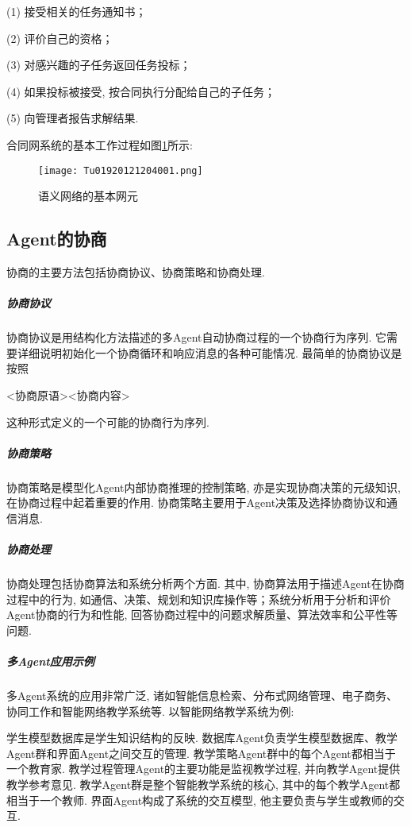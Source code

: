     (1) 接受相关的任务通知书；

    (2) 评价自己的资格；

    (3) 对感兴趣的子任务返回任务投标；

    (4) 如果投标被接受, 按合同执行分配给自己的子任务；

    (5)  向管理者报告求解结果.

合同网系统的基本工作过程如图\ref{Tu01920121204001}所示:
\begin{figure}[H]
\centering
\texttt{[image: Tu01920121204001.png]}
\caption{语义网络的基本网元}
\label{Tu01920121204001}
\end{figure}
\subsection{Agent的协商}
协商的主要方法包括协商协议、协商策略和协商处理.
\subparagraph{协商协议}
    协商协议是用结构化方法描述的多Agent自动协商过程的一个协商行为序列. 它需要详细说明初始化一个协商循环和响应消息的各种可能情况. 最简单的协商协议是按照
\begin{center}
  <协商原语><协商内容>
\end{center}
这种形式定义的一个可能的协商行为序列.
\subparagraph{协商策略}
协商策略是模型化Agent内部协商推理的控制策略, 亦是实现协商决策的元级知识, 在协商过程中起着重要的作用. 协商策略主要用于Agent决策及选择协商协议和通信消息.
\subparagraph{协商处理}
协商处理包括协商算法和系统分析两个方面. 其中, 协商算法用于描述Agent在协商过程中的行为, 如通信、决策、规划和知识库操作等；系统分析用于分析和评价Agent协商的行为和性能, 回答协商过程中的问题求解质量、算法效率和公平性等问题.
\subparagraph{多Agent应用示例}
多Agent系统的应用非常广泛, 诸如智能信息检索、分布式网络管理、电子商务、协同工作和智能网络教学系统等. 以智能网络教学系统为例:
\begin{example}
学生模型数据库是学生知识结构的反映. 数据库Agent负责学生模型数据库、教学Agent群和界面Agent之间交互的管理. 教学策略Agent群中的每个Agent都相当于一个教育家. 教学过程管理Agent的主要功能是监视教学过程, 并向教学Agent提供教学参考意见. 教学Agent群是整个智能教学系统的核心, 其中的每个教学Agent都相当于一个教师. 界面Agent构成了系统的交互模型, 他主要负责与学生或教师的交互.
\end{example}
